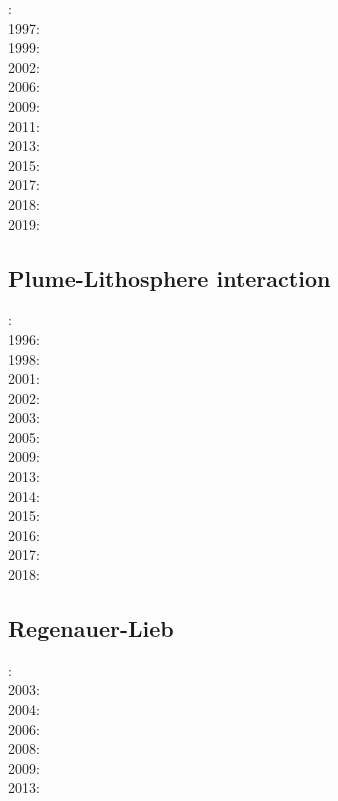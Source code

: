 : \cite{nasf94}\cite{hayu94}\\
1997: \cite{vank97}\\
1999: \cite{lays99}\\
2002: \cite{falt02}\\
2006: \cite{isst06}\cite{liva06a}\cite{liva06b}\cite{zhon06}\\
2009: \cite{vavl09}\\
2011: \cite{toyu11}\cite{talz11}\cite{burk11}\cite{memm11}\cite{dalt11}\\
2013: \cite{dagm13}\cite{madd13}\cite{ande13}\\
2015: \cite{daso15}\cite{hafg15}\\
2017: \cite{zhli17}\\
2018: \cite{dacc18}\\
2019: \cite{argc19}

\subsection*{Plume-Lithosphere interaction}

: \cite{rich94}\\
1996: \cite{zhgm96}\\
1998: \cite{bisp98}\\
2001: \cite{vapy01}\\
2002: \cite{foul02}\\
2003: \cite{vazh03}\\
2005: \cite{bugu05}\\
2009: \cite{bucl09}\cite{zhgy09}\cite{baiv10}\\
2013: \cite{bemm13}\cite{brps13}\\
2014: \cite{buge14}\\
2015: \cite{bemm15}\cite{gesb15}\cite{kocb15}\cite{meds15}\\
2016: \cite{fige16}\cite{gadb16}\\
2017: \cite{bahf17}\cite{brsg17}\cite{bahf17}\cite{bekb17}\\
2018: \cite{daga18}

\subsection*{Regenauer-Lieb}

: \cite{reyu00}\\
2003: \cite{reyu03}\\
2004: \cite{reyu04}\\
2006: \cite{rehy06}\cite{rewr06}\\
2008: \cite{rerw08}\\
2009: \cite{reps09}\\
2013: \cite{revp13}

